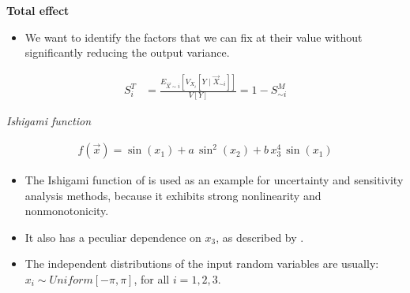 \begin{frame}\textbf{Total effect}\vspace{0.3cm}

\begin{itemize}
\item We want to identify the factors that we can fix at their value without significantly reducing the output variance.
\end{itemize}

\begin{align*}
S^T_i & = \frac{E_{\vec{X} \sim i}[V_{X_i}[Y \mid \vec{X}_{\sim i}]]}{V[Y]} = 1 - S^M_{\sim i}
\end{align*}

\end{frame}
\begin{frame}\begin{center}
		\LARGE\textit{Ishigami function}

		\begin{align*}
				f(\vec{x}) = \sin(x_1) + a\, \sin^2 (x_2) + b\, x_3^4\, \sin(x_1)
		\end{align*}

\end{center}\end{frame}
\begin{frame}

	\begin{itemize}\setlength\itemsep{1em}
		\item The Ishigami function of  is used as an example for uncertainty and sensitivity analysis methods, because it exhibits strong nonlinearity and nonmonotonicity.

		\item It also has a peculiar dependence on $x_3$, as described by .

		 \item The independent distributions of the input random variables are usually: $x_i \sim Uniform[-\pi, \pi]$, for all $i = 1, 2, 3$.
	\end{itemize}

\end{frame}

